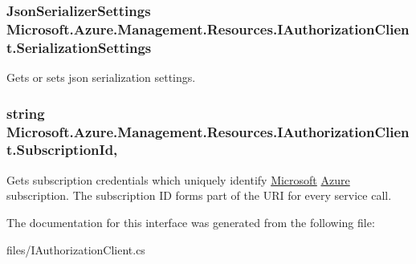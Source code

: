 \subsubsection[{\texorpdfstring{Serialization\+Settings}{SerializationSettings}}]{\setlength{\rightskip}{0pt plus 5cm}Json\+Serializer\+Settings Microsoft.\+Azure.\+Management.\+Resources.\+I\+Authorization\+Client.\+Serialization\+Settings\hspace{0.3cm}{\ttfamily [get]}}\hypertarget{interface_microsoft_1_1_azure_1_1_management_1_1_resources_1_1_i_authorization_client_a6ab4feaa6a0065c2a6a60ada5bd60c87}{}\label{interface_microsoft_1_1_azure_1_1_management_1_1_resources_1_1_i_authorization_client_a6ab4feaa6a0065c2a6a60ada5bd60c87}


Gets or sets json serialization settings. 

\subsubsection[{\texorpdfstring{Subscription\+Id}{SubscriptionId}}]{\setlength{\rightskip}{0pt plus 5cm}string Microsoft.\+Azure.\+Management.\+Resources.\+I\+Authorization\+Client.\+Subscription\+Id\hspace{0.3cm}{\ttfamily [get]}, {\ttfamily [set]}}\hypertarget{interface_microsoft_1_1_azure_1_1_management_1_1_resources_1_1_i_authorization_client_a0d9b5f4063c29434136a96f5a7961a83}{}\label{interface_microsoft_1_1_azure_1_1_management_1_1_resources_1_1_i_authorization_client_a0d9b5f4063c29434136a96f5a7961a83}


Gets subscription credentials which uniquely identify \hyperlink{namespace_microsoft}{Microsoft} \hyperlink{namespace_microsoft_1_1_azure}{Azure} subscription. The subscription ID forms part of the U\+RI for every service call. 



The documentation for this interface was generated from the following file\+:\begin{DoxyCompactItemize}
\item 
files/I\+Authorization\+Client.\+cs\end{DoxyCompactItemize}
